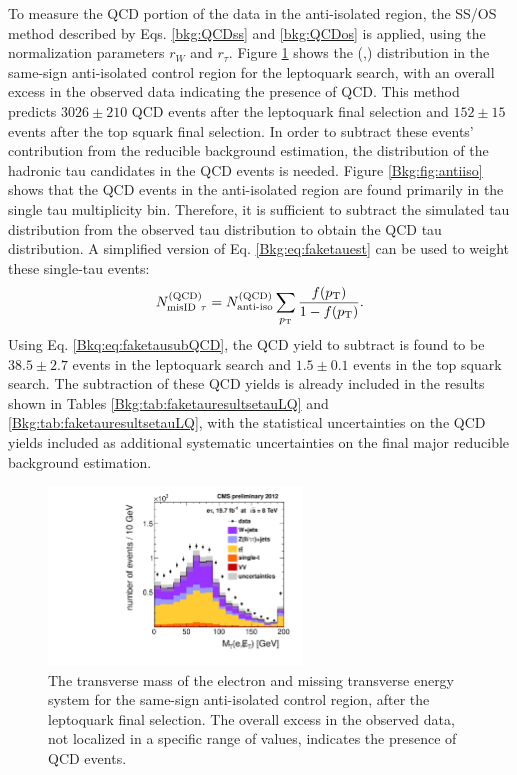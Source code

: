 To measure the QCD portion of the data in the anti-isolated region, the SS/OS method described by Eqs. \eqref{bkg:QCDss} and \eqref{bkg:QCDos} is applied, using the normalization parameters $r_{W}$ and $r_{\tau}$. Figure \ref{fig:QCDSSAiso} shows the \MT(\Pe,\met) distribution in the same-sign anti-isolated control region for the leptoquark search, with an overall excess in the observed data indicating the presence of QCD. This method predicts $3026\pm210$ QCD events after the leptoquark final selection and $152\pm15$ events after the top squark final selection. In order to subtract these events' contribution from the reducible background estimation, the \pt distribution of the hadronic tau candidates in the QCD events is needed. Figure \ref{Bkg:fig:antiiso} shows that the QCD events in the \etau anti-isolated region are found primarily in the single tau multiplicity bin. Therefore, it is sufficient to subtract the simulated tau \pt distribution from the observed tau \pt distribution to obtain the QCD tau \pt distribution. A simplified version of Eq. \eqref{Bkg:eq:faketauest} can be used to weight these single-tau events:
\begin{equation}
N_{\text{misID}~\tau}^{\text{(QCD)}} = N_{\text{anti-iso}}^{\text{(QCD)}} \sum_{p_{\mathrm{T}}}{\frac{f(p_{\mathrm{T}})}{1-f(p_{\mathrm{T}})}}. \label{Bkq:eq:faketausubQCD}
\end{equation}
Using Eq. \eqref{Bkq:eq:faketausubQCD}, the QCD yield to subtract is found to be $38.5\pm2.7$ events in the leptoquark search and $1.5\pm0.1$ events in the top squark search. The subtraction of these QCD yields is already included in the results shown in Tables \ref{Bkg:tab:faketauresultsetauLQ} and \ref{Bkg:tab:faketauresultsetauLQ}, with the statistical uncertainties on the QCD yields included as additional systematic uncertainties on the final major reducible background estimation.

\begin{figure}[hbt]
  \begin{center}
    \includegraphics[width=0.6\textwidth]{figures/etau/eMETTMassSSAIsoFinal.pdf}
    \caption{The transverse mass of the electron and missing transverse energy system for the same-sign anti-isolated control region, after the leptoquark final selection. The overall excess in the observed data, not localized in a specific range of \MT values, indicates the presence of QCD events.}
    \label{fig:QCDSSAiso}
  \end{center}
\end{figure}

